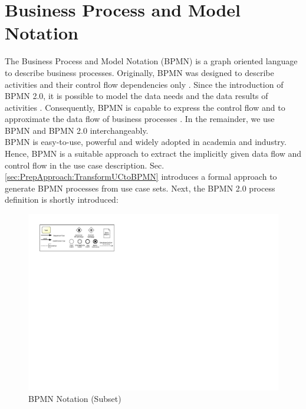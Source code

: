 \section{Business Process and Model Notation}
\label{sec:PrepApproach:BPMN}
The Business Process and Model Notation (BPMN) is a graph oriented language to describe business processes. Originally, BPMN was designed to describe activities and their control flow dependencies only \cite{VisualizeBPMN}. Since the introduction of BPMN 2.0, it is possible to model the data needs and the data results of activities \cite{OMG}. Consequently, BPMN is capable to express the control flow and to approximate the data flow of business processes \cite{DataFlowErrorBPMN}. In the remainder, we use BPMN and BPMN 2.0 interchangeably. \\
BPMN is easy-to-use, powerful and widely adopted in academia and industry. Hence, BPMN is a suitable approach to extract the implicitly given data flow and control flow in the use case description. Sec.\ref{sec:PrepApproach:TransformUCtoBPMN} introduces a formal approach to generate BPMN processes from use case sets. Next, the BPMN 2.0 process definition is shortly introduced:

\begin{figure}[h!]
	\includegraphics[width=\textwidth, trim={1cm 16.8cm 19.5cm 1cm}]{img/Overview.pdf}
	\caption{BPMN Notation (Subset)}
	\label{fig:BPMNSubset}
\end{figure}

